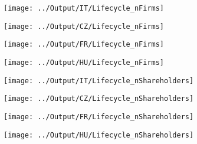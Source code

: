 \documentclass[12pt,notitlepage]{article}
\begin{document}
\begin{figure}[!htpb]
\centering
\caption{Firms Distribution across age}
\begin{subfigure}{.49\textwidth}
    \centering
 \texttt{[image: ../Output/IT/Lifecycle\_nFirms]}
\end{subfigure}%
\begin{subfigure}{.49\textwidth}
    \centering
 \texttt{[image: ../Output/CZ/Lifecycle\_nFirms]}
\end{subfigure}
\begin{subfigure}{.49\textwidth}
    \centering
 \texttt{[image: ../Output/FR/Lifecycle\_nFirms]}
\end{subfigure}%
\begin{subfigure}{.49\textwidth}
    \centering
 \texttt{[image: ../Output/HU/Lifecycle\_nFirms]}
\end{subfigure}
\end{figure}
\pagebreak

\begin{figure}[!htpb]
\centering
\caption{Firm age and Number of Shareholders}
\begin{subfigure}{.49\textwidth}
    \centering
 \texttt{[image: ../Output/IT/Lifecycle\_nShareholders]}
\end{subfigure}%
\begin{subfigure}{.49\textwidth}
    \centering
 \texttt{[image: ../Output/CZ/Lifecycle\_nShareholders]}
\end{subfigure}
\begin{subfigure}{.49\textwidth}
    \centering
 \texttt{[image: ../Output/FR/Lifecycle\_nShareholders]}
\end{subfigure}%
\begin{subfigure}{.49\textwidth}
    \centering
 \texttt{[image: ../Output/HU/Lifecycle\_nShareholders]}
\end{subfigure}
\end{figure}
\pagebreak
\end{document}
